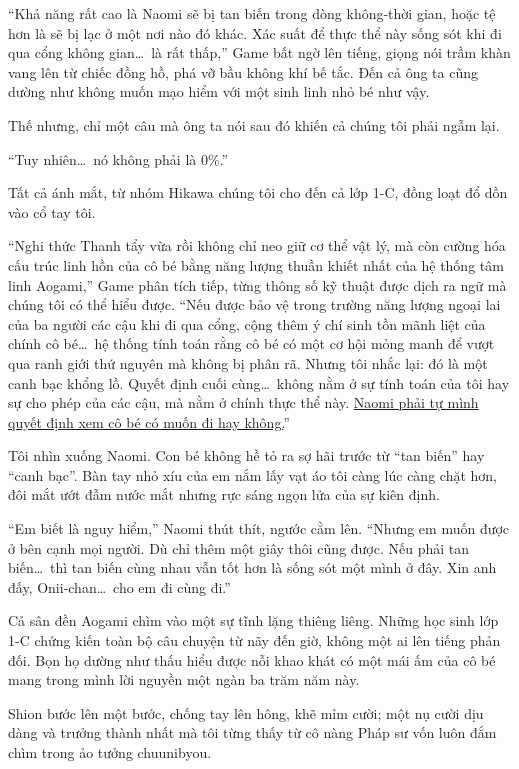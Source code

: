 \documentclass[../main.tex]{subfiles}
\begin{document}
``Khả năng rất cao là Naomi sẽ bị tan biến trong dòng không-thời gian, hoặc tệ hơn là sẽ bị lạc ở một nơi nào đó khác. Xác suất để thực thể này sống sót khi đi qua cổng không gian\dots\ là rất thấp,'' Game bất ngờ lên tiếng, giọng nói trầm khàn vang lên từ chiếc đồng hồ, phá vỡ bầu không khí bế tắc. Đến cả ông ta cũng dường như không muốn mạo hiểm với một sinh linh nhỏ bé như vậy.

Thế nhưng, chỉ một câu mà ông ta nói sau đó khiến cả chúng tôi phải ngẫm lại.

``Tuy nhiên\dots\ nó không phải là 0\%.''

Tất cả ánh mắt, từ nhóm Hikawa chúng tôi cho đến cả lớp 1-C, đồng loạt đổ dồn vào cổ tay tôi.

``Nghi thức Thanh tẩy vừa rồi không chỉ neo giữ cơ thể vật lý, mà còn cường hóa cấu trúc linh hồn của cô bé bằng năng lượng thuần khiết nhất của hệ thống tâm linh Aogami,'' Game phân tích tiếp, từng thông số kỹ thuật được dịch ra ngữ mà chúng tôi có thể hiểu được. ``Nếu được bảo vệ trong trường năng lượng ngoại lai của ba người các cậu khi đi qua cổng, cộng thêm ý chí sinh tồn mãnh liệt của chính cô bé\dots\ hệ thống tính toán rằng cô bé có một cơ hội mỏng manh để vượt qua ranh giới thứ nguyên mà không bị phân rã. Nhưng tôi nhắc lại: đó là một canh bạc khổng lồ. Quyết định cuối cùng\dots\ không nằm ở sự tính toán của tôi hay sự cho phép của các cậu, mà nằm ở chính thực thể này. \uline{Naomi phải tự mình quyết định xem cô bé có muốn đi hay không.}''

Tôi nhìn xuống Naomi. Con bé không hề tỏ ra sợ hãi trước từ ``tan biến'' hay ``canh bạc''. Bàn tay nhỏ xíu của em nắm lấy vạt áo tôi càng lúc càng chặt hơn, đôi mắt ướt đẫm nước mắt nhưng rực sáng ngọn lửa của sự kiên định.

``Em biết là nguy hiểm,'' Naomi thút thít, ngước cằm lên. ``Nhưng em muốn được ở bên cạnh mọi người. Dù chỉ thêm một giây thôi cũng được. Nếu phải tan biến\dots\ thì tan biến cùng nhau vẫn tốt hơn là sống sót một mình ở đây. Xin anh đấy, Onii-chan\dots\ cho em đi cùng đi.''

Cả sân đền Aogami chìm vào một sự tĩnh lặng thiêng liêng. Những học sinh lớp 1-C chứng kiến toàn bộ câu chuyện từ nãy đến giờ, không một ai lên tiếng phản đối. Bọn họ dường như thấu hiểu được nỗi khao khát có một mái ấm của cô bé mang trong mình lời nguyền một ngàn ba trăm năm này.

Shion bước lên một bước, chống tay lên hông, khẽ mỉm cười; một nụ cười dịu dàng và trưởng thành nhất mà tôi từng thấy từ cô nàng Pháp sư vốn luôn đắm chìm trong ảo tưởng chuunibyou.
\end{document}
